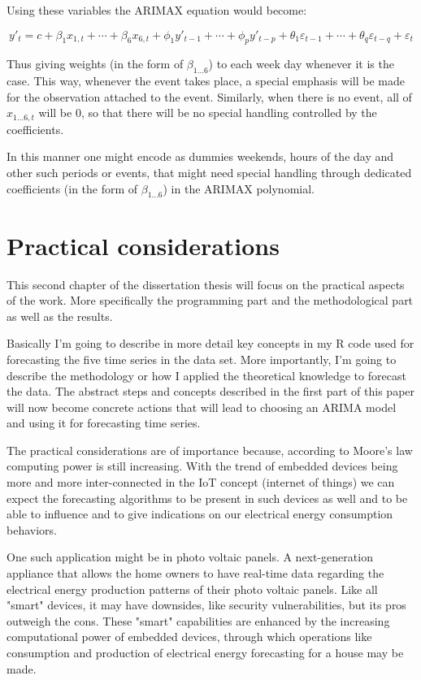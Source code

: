 \documentclass[12pt,a4paper,titlepage]{report}
\begin{document}
Using these variables the ARIMAX equation would become:

\[
y'_{t} = c + \beta_{1} x_{1,t} + \cdots + \beta_{6} x_{6,t} + \phi_{1}y'_{t-1} + \cdots + \phi_{p}y'_{t-p} + \theta_{1}\varepsilon_{t-1} + \cdots + \theta_{q}\varepsilon_{t-q} + \varepsilon_{t} 
\]

Thus giving weights (in the form of $ \beta_{1\dots6} $) to each week day whenever it is the case. This way, whenever the event takes place, a special emphasis will be made for the observation attached to the event. Similarly, when there is no event, all of $ x_{1\dots6,t} $ will be 0, so that there will be no special handling controlled by the coefficients.

In this manner one might encode as dummies weekends, hours of the day and other such periods or events, that might need special handling through dedicated coefficients (in the form of $ \beta_{1\dots6} $) in the ARIMAX polynomial.

\newpage
\chapter{Practical considerations}
This second chapter of the dissertation thesis will focus on the practical aspects of the work. More specifically the programming part and the methodological part as well as the results.

Basically I'm going to describe in more detail key concepts in my R code used for forecasting the five time series in the data set.
More importantly, I'm going to describe the methodology or how I applied the theoretical knowledge to forecast the data. The abstract steps and concepts described in the first part of this paper will now become concrete actions that will lead to choosing an ARIMA model and using it for forecasting time series.

The practical considerations are of importance because, according to Moore's law \cite{moore:1965} computing power is still increasing. 
With the trend of embedded devices being more and more inter-connected in the IoT concept (internet of things) we can expect the forecasting algorithms to be present in such devices as well and to be able to influence and to give indications on our electrical energy consumption behaviors.

One such application might be in photo voltaic panels. A next-generation appliance that allows the home owners to have real-time data regarding the electrical energy production patterns of their photo voltaic panels. Like all "smart" devices, it may have downsides, like security vulnerabilities, but its pros outweigh the cons. These "smart" capabilities are enhanced by the increasing computational power of embedded devices, through which operations like consumption and production of electrical energy forecasting for a house may be made.
\end{document}
